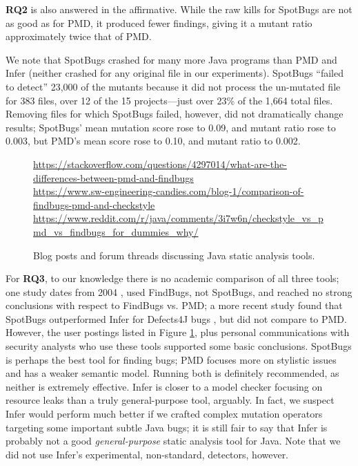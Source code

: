 {\bf RQ2} is also answered in the affirmative.  While the raw kills for SpotBugs are not as good as for PMD, it produced fewer findings, giving it a mutant ratio approximately twice that of PMD.

We note that SpotBugs crashed for many more Java programs than PMD and Infer (neither crashed for any original file in our experiments).  SpotBugs ``failed to detect'' 23,000 of the mutants because it did not process the un-mutated file for 383 files, over 12 of the 15 projects---just over 23\% of the 1,664 total files.  Removing files for which SpotBugs failed, however, did not dramatically change results; SpotBugs' mean mutation score rose to 0.09, and mutant ratio rose to 0.003, but PMD's mean score rose to 0.10, and mutant ratio to 0.002.

\begin{figure}
  {\scriptsize
    \raggedright    
  \url{https://stackoverflow.com/questions/4297014/what-are-the-differences-between-pmd-and-findbugs} \\
  \url{https://www.sw-engineering-candies.com/blog-1/comparison-of-findbugs-pmd-and-checkstyle} \\
  \url{https://www.reddit.com/r/java/comments/3i7w6n/checkstyle_vs_pmd_vs_findbugs_for_dummies_why/} \\
  }
\caption{Blog posts and forum threads discussing Java static analysis tools.}
\label{fig:blog}
\end{figure}

For {\bf RQ3}, to our knowledge there is no academic comparison of all three tools; one study dates from 2004 \cite{CompareJavaTools}, used FindBugs, not SpotBugs, and reached no strong conclusions with respect to FindBugs vs. PMD; a more recent study found that SpotBugs outperformed Infer for Defects4J \cite{just2014defects4j} bugs \cite{AllBugs}, but did not compare to PMD.  However, the user postings listed in Figure \ref{fig:blog}, plus personal communications with security analysts who use these tools \cite{personalJava} supported some basic conclusions.  SpotBugs is perhaps the best tool for finding bugs; PMD focuses more on stylistic issues and has a weaker semantic model.  Running both is definitely recommended, as neither is extremely effective.  Infer is closer to a model checker focusing on resource leaks than a truly general-purpose tool, arguably.  In fact, we suspect Infer would perform much better if we crafted complex mutation operators targeting some important subtle Java bugs; it is still fair to say that Infer is probably not a good \emph{general-purpose} static analysis tool for Java.  Note that we did not use Infer's experimental, non-standard, detectors, however.

